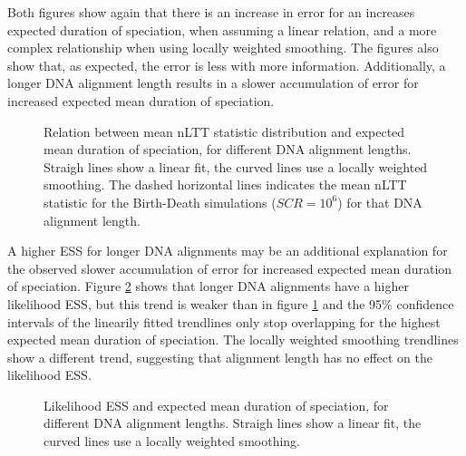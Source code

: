 Both figures show again that there is an 
increase in error for an increases expected duration
of speciation, when assuming a linear relation, and
a more complex relationship when using locally weighted smoothing. 
The figures also show that, as expected, 
the error is less with more information. Additionally,
a longer DNA alignment length results in a slower accumulation of error
for increased expected mean duration of speciation.   

\begin{figure}[!htbp]


  \caption{
    Relation between mean nLTT statistic distribution
    and  expected mean duration of speciation, for different DNA
    alignment lengths. Straigh lines show a linear
    fit, the curved lines use a locally weighted smoothing.
    The dashed horizontal lines indicates
    the mean nLTT statistic for the Birth-Death simulations ($SCR = 10^6$)
    for that DNA alignment length.
  }
  \label{fig:error_expected_mean_dur_spec_alignment_length}
\end{figure}

A higher ESS for longer DNA alignments may be an additional
explanation for the observed slower accumulation of error
for increased expected mean duration of speciation.
Figure \ref{fig:ess_expected_mean_dur_spec_alignment_length}
shows that longer DNA alignments have a higher likelihood ESS, 
but this trend is weaker than in figure 
\ref{fig:error_expected_mean_dur_spec_alignment_length} and
the 95\% confidence intervals of the linearily fitted trendlines only
stop overlapping for the highest expected mean duration of speciation.
The locally weighted smoothing trendlines show a different trend,
suggesting that alignment length has no effect on the
likelihood ESS.


\begin{figure}[!htbp]
  \caption{
    Likelihood ESS and expected mean duration of speciation, for different DNA
    alignment lengths. Straigh lines show a linear
    fit, the curved lines use a locally weighted smoothing.
  }
  \label{fig:ess_expected_mean_dur_spec_alignment_length}
\end{figure}


